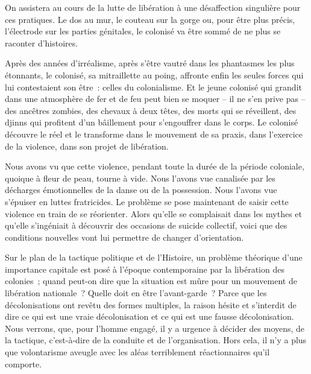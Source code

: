\documentclass[french,twoside]{book} %
\begin{document}
On assistera au cours de la lutte de libération à une désaffection singulière pour ces pratiques. Le dos au mur, le couteau sur la gorge ou, pour être plus précis, l’électrode sur les parties génitales, le colonisé va être sommé de ne plus se raconter d’histoires.\par
Après des années d’irréalisme, après s’être vautré dans les phantasmes les plus étonnants, le colonisé, sa mitraillette au poing, affronte enfin les seules forces qui lui contestaient son être : celles du colonialisme. Et le jeune colonisé qui grandit dans une atmosphère de fer et de feu peut bien se moquer – il ne   s’en prive pas – des ancêtres zombies, des chevaux à deux têtes, des morts qui se réveillent, des djinns qui profitent d’un bâillement pour s’engouffrer dans le corps. Le colonisé découvre le réel et le transforme dans le mouvement de sa praxis, dans l’exercice de la violence, dans son projet de libération.\par
\bigbreak
\noindent Nous avons vu que cette violence, pendant toute la durée de la période coloniale, quoique à fleur de peau, tourne à vide. Nous l’avons vue canalisée par les décharges émotionnelles de la danse ou de la possession. Nous l’avons vue s’épuiser en luttes fratricides. Le problème se pose maintenant de saisir cette violence en train de se réorienter. Alors qu’elle se complaisait dans les mythes et qu’elle s’ingéniait à découvrir des occasions de suicide collectif, voici que des conditions nouvelles vont lui permettre de changer d’orientation.\par
\bigbreak
\noindent Sur le plan de la tactique politique et de l’Histoire, un problème théorique d’une importance capitale est posé à l’époque contemporaine par la libération des colonies ; quand peut-on dire que la situation est mûre pour un mouvement de libération nationale ? Quelle doit en être l’avant-garde ? Parce que les décolonisations ont revêtu des formes multiples, la raison hésite et s’interdit de dire ce qui est une vraie décolonisation et ce qui est une fausse décolonisation. Nous verrons, que, pour l’homme engagé, il y a urgence à décider des moyens, de la tactique, c’est-à-dire de la conduite et de l’organisation. Hors cela, il n’y a plus que volontarisme aveugle avec les aléas terriblement réactionnaires qu’il comporte.\par
\bigbreak
\end{document}

